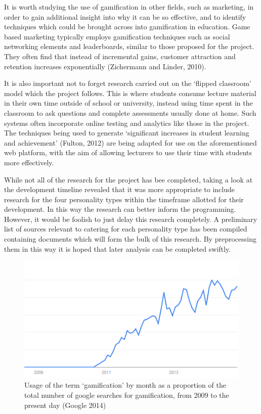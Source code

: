 \documentclass[10pt,a4paper]{report}
\begin{document}
It is worth studying the use of gamification in other fields, such as marketing, in order to gain additional insight into why it can be so effective, and to identify techniques which could be brought across into gamification in education. Game based marketing typically employs gamification techniques such as social networking elements and leaderboards, similar to those proposed for the project. They often find that instead of incremental gains, customer attraction and retention increases exponentially (Zichermann and Linder, 2010). 

It is also important not to forget research carried out on the `flipped classroom' model which the project follows. This is where students consume lecture material in their own time outside of school or university, instead using time spent in the classroom to ask questions and complete assessments usually done at home. Such systems often incorporate online testing and analytics like those in the project. The techniques being used to generate `significant increases in student learning and achievement' (Fulton, 2012) are being adapted for use on the aforementioned web platform, with the aim of allowing lecturers to use their time with students more effectively.

While not all of the research for the project has bee completed, taking a look at the development timeline revealed that it was more appropriate to include research for the four personality types within the timeframe allotted for their development. In this way the research can better inform the programming. However, it would be foolish to just delay this research completely. A preliminary list of sources relevant to catering for each personality type has been compiled containing documents which will form the bulk of this research. By preprocessing them in this way it is hoped that later analysis can be completed swiftly.

\begin{figure}
	\includegraphics{../img/usage-graph.png}
	\caption{Usage of the term `gamification' by month as a proportion of the total number of google searches for gamification, from 2009 to the present day (Google 2014)}
	\label{usage}
\end{figure}
\end{document}
